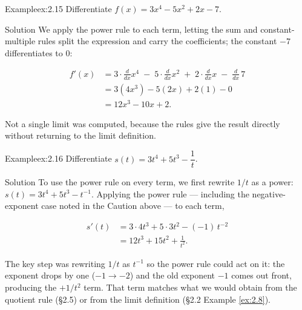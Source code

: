 \documentclass[a4paper,12pt,oneside]{memoir}
\begin{document}
\begin{workedexample}
\begin{envexample}{Example}{ex:2.15}{}
Differentiate \(f(x) = 3x^{4} - 5x^{2} + 2x - 7\).
\end{envexample}
\begin{envsolution}{Solution}{}{}
We apply the power rule to each term, letting the sum and constant-multiple rules split the expression and carry the coefficients; the constant \(-7\) differentiates to \(0\):

\[ \begin{aligned}
          f'(x) &= 3\cdot\frac{d}{dx}x^{4} \;-\; 5\cdot\frac{d}{dx}x^{2} \;+\; 2\cdot\frac{d}{dx}x \;-\; \frac{d}{dx}\,7 \\[2pt]
                &= 3(4x^{3}) - 5(2x) + 2(1) - 0 \\[2pt]
                &= 12x^{3} - 10x + 2.
        \end{aligned} \]

Not a single limit was computed, because the rules give the result directly without returning to the limit definition.
\end{envsolution}
\end{workedexample}
\begin{workedexample}
\begin{envexample}{Example}{ex:2.16}{}
Differentiate \(s(t) = 3t^{4} + 5t^{3} - \dfrac{1}{t}\).
\end{envexample}
\begin{envsolution}{Solution}{}{}
To use the power rule on every term, we first rewrite \(1/t\) as a power: \(s(t) = 3t^{4} + 5t^{3} - t^{-1}\). Applying the power rule — including the negative-exponent case noted in the Caution above — to each term,

\[ \begin{aligned}
          s'(t) &= 3 \cdot 4t^{3} + 5 \cdot 3t^{2} - (-1)\,t^{-2} \\[2pt]
                &= 12t^{3} + 15t^{2} + \frac{1}{t^{2}}.
        \end{aligned} \]

The key step was rewriting \(1/t\) as \(t^{-1}\) so the power rule could act on it: the exponent drops by one (\(-1 \to -2\)) and the old exponent \(-1\) comes out front, producing the \(+1/t^{2}\) term. That term matches what we would obtain from the quotient rule (§2.5) or from the limit definition (§2.2 Example \ref{ex:2.8}).
\end{envsolution}
\end{workedexample}
\end{document}
